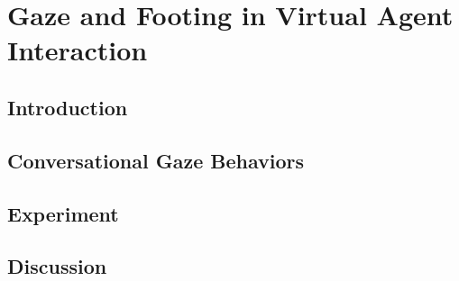 \pagestyle{deposit}

\chapter{Gaze and Footing in Virtual Agent Interaction}
\label{cha:GazeFooting}

\section{Introduction}
\label{sec:GazeFootingIntro}


\section{Conversational Gaze Behaviors}
\label{sec:GazeFootingBehaviors}


\section{Experiment}
\label{sec:GazeFootingExperiment}


\section{Discussion}
\label{sec:GazeFootingDiscussion}

